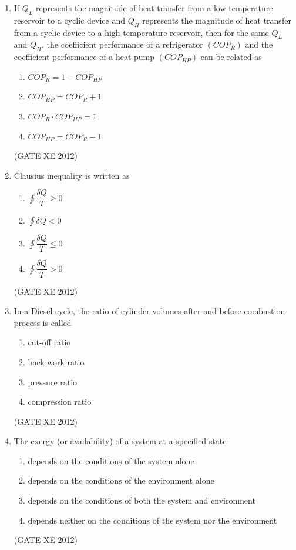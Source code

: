 \documentclass[12pt]{article}
\begin{document}
\begin{enumerate}
\item If $Q_L$ represents the magnitude of heat transfer from a low temperature reservoir to a cyclic device and $Q_H$ represents the magnitude of heat transfer from a cyclic device to a high temperature reservoir, then for the same $Q_L$ and $Q_H$, the coefficient performance of a refrigerator $(COP_R)$ and the coefficient performance of a heat pump $(COP_{HP})$ can be related as  
\begin{multicols}{2}
\begin{enumerate}
    \item $COP_R = 1 - COP_{HP}$  
    \item $COP_{HP} = COP_R + 1$  
    \item $COP_R \cdot COP_{HP} = 1$  
    \item $COP_{HP} = COP_R - 1$  
\end{enumerate}
\end{multicols}
(GATE XE 2012)

\item Clausius inequality is written as  
\begin{multicols}{2}
\begin{enumerate}
    \item $\oint \dfrac{\delta Q}{T} \geq 0$  
    \item $\oint \delta Q < 0$  
    \item $\oint \dfrac{\delta Q}{T} \leq 0$  
    \item $\oint \dfrac{\delta Q}{T} > 0$  
\end{enumerate}
\end{multicols}
(GATE XE 2012)

\item In a Diesel cycle, the ratio of cylinder volumes after and before combustion process is called  
\begin{multicols}{4}
\begin{enumerate}
    \item cut-off ratio  
    \item back work ratio  
    \item pressure ratio  
    \item compression ratio  
\end{enumerate}
\end{multicols}
(GATE XE 2012)

\item The exergy (or availability) of a system at a specified state  
\begin{enumerate}
    \item depends on the conditions of the system alone  
    \item depends on the conditions of the environment alone  
    \item depends on the conditions of both the system and environment  
    \item depends neither on the conditions of the system nor the environment  
\end{enumerate}
(GATE XE 2012)


\end{enumerate}
\end{document}
